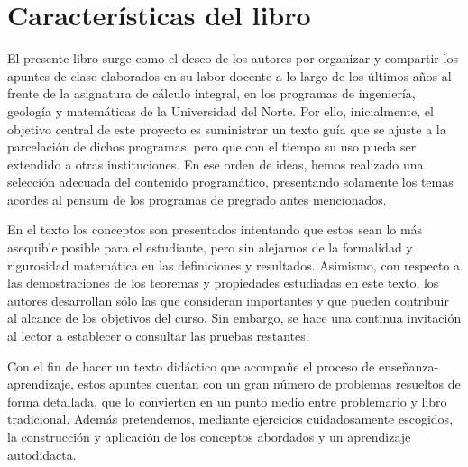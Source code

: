 \section*{Caracter\'isticas del libro}
El presente libro surge como el deseo de los autores por organizar y compartir los apuntes de clase elaborados en su labor docente a lo largo de los últimos años al frente de la asignatura de cálculo integral, en los programas de ingeniería, geología y matemáticas de la Universidad del Norte. Por ello, inicialmente, el objetivo central de este proyecto es suministrar un texto guía que se ajuste a la parcelación de dichos programas, pero que con el tiempo su uso pueda ser extendido a otras instituciones. En ese orden de ideas, hemos realizado una selección adecuada del contenido programático, presentando solamente los temas acordes al pensum de los programas de pregrado antes mencionados.


En el texto los conceptos son presentados intentando que estos sean lo más asequible posible para el estudiante, pero sin alejarnos de la formalidad y rigurosidad matemática en las definiciones y resultados. Asimismo, con respecto a las demostraciones de los teoremas y propiedades estudiadas en este texto, los autores desarrollan sólo las que consideran importantes y que pueden contribuir al alcance de los objetivos del curso. Sin embargo, se hace una continua invitación al lector a establecer o consultar las pruebas restantes.

Con el fin de hacer un texto didáctico que acompañe el proceso de ense\~nanza-aprendizaje, estos apuntes cuentan con un gran número de problemas resueltos de forma detallada, que lo convierten en un punto medio entre problemario y libro tradicional. Además pretendemos, mediante ejercicios cuidadosamente escogidos, la construcción y aplicación de los conceptos abordados y un aprendizaje autodidacta.

